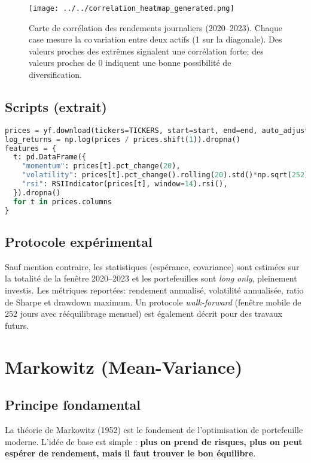 \documentclass[11pt,a4paper]{article}
\begin{document}
\begin{figure}[h]
  \centering
  \texttt{[image: ../../correlation\_heatmap\_generated.png]}
  \caption{Carte de corrélation des rendements journaliers (2020--2023). Chaque case mesure la co\,variation entre deux actifs (1 sur la diagonale). Des valeurs proches des extrêmes signalent une corrélation forte; des valeurs proches de 0 indiquent une bonne possibilité de diversification.}
  \label{fig:corr_external}
\end{figure}

\subsection{Scripts (extrait)}
\begin{lstlisting}[language=Python,caption={Téléchargement et prétraitement (extrait)}]
prices = yf.download(tickers=TICKERS, start=start, end=end, auto_adjust=True)["Close"].dropna()
log_returns = np.log(prices / prices.shift(1)).dropna()
features = {
  t: pd.DataFrame({
    "momentum": prices[t].pct_change(20),
    "volatility": prices[t].pct_change().rolling(20).std()*np.sqrt(252),
    "rsi": RSIIndicator(prices[t], window=14).rsi(),
  }).dropna()
  for t in prices.columns
}
\end{lstlisting}

\subsection{Protocole expérimental}
Sauf mention contraire, les statistiques (espérance, covariance) sont estimées sur la totalité de la fenêtre 2020--2023 et les portefeuilles sont \emph{long only}, pleinement investis. Les métriques reportées: rendement annualisé, volatilité annualisée, ratio de Sharpe et drawdown maximum. Un protocole \emph{walk-forward} (fenêtre mobile de 252 jours avec rééquilibrage mensuel) est également décrit pour des travaux futurs.

\section{Markowitz (Mean-Variance)}

\subsection{Principe fondamental}
La théorie de Markowitz (1952) est le fondement de l'optimisation de portefeuille moderne. L'idée de base est simple : \textbf{plus on prend de risques, plus on peut espérer de rendement, mais il faut trouver le bon équilibre}.
\end{document}
